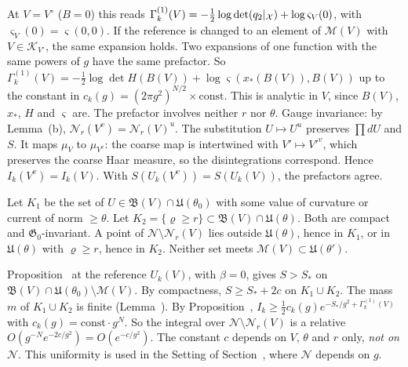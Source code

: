 \begin{detail}
\begin{step}[(vi) Conclusion]
At $V=V^\circ$ ($B=0$) this reads $\Gamma^{(1)}_k(V)=-\frac12\log\det(q_2|_\mathcal X)+\log\varsigma_V(0)$, with $\varsigma_V(0)=\varsigma(0,0)$. If the reference is changed to an element of $\mathscr M(V)$ with $V\in\mathcal K_{V^\circ}$, the same expansion holds. Two expansions of one function with the same powers of $g$ have the same prefactor. So $\Gamma^{(1)}_k(V)=-\frac12\log\det H(B(V))+\log\varsigma(x_*(B(V)),B(V))$ up to the constant in $c_k(g)=(2\pi g^2)^{N/2}\times\mathrm{const}$. This is analytic in $V$, since $B(V)$, $x_*$, $H$ and $\varsigma$ are. The prefactor involves neither $r$ nor $\theta$. Gauge invariance: by Lemma~(b), $\mathscr N_r(V^v)=\mathscr N_r(V)^u$. The substitution $U\mapsto U^u$ preserves $\prod dU$ and $S$. It maps $\mu_V$ to $\mu_{V^v}$: the coarse map is intertwined with $V'\mapsto V'^v$, which preserves the coarse Haar measure, so the disintegrations correspond. Hence $I_k(V^v)=I_k(V)$. With $S(U_k(V^v))=S(U_k(V))$, the prefactors agree.
\end{step}
\end{detail}

\begin{detail}\label{d11a:A12}
\begin{step}[Sets]
Let $K_1$ be the set of $U\in\mathfrak B(V)\cap\mathfrak U(\theta_0)$ with some value of curvature or current of norm $\ge\theta$. Let $K_2=\{\varrho\ge r\}\subset\mathfrak B(V)\cap\mathfrak U(\theta)$. Both are compact and $\mathfrak G_0$-invariant. A point of $\mathscr N\setminus\mathscr N_r(V)$ lies outside $\mathfrak U(\theta)$, hence in $K_1$, or in $\mathfrak U(\theta)$ with $\varrho\ge r$, hence in $K_2$. Neither set meets $\mathscr M(V)\subset\mathfrak U(\theta')$.
\end{step}
\begin{step}
Proposition~ at the reference $U_k(V)$, with $\beta=0$, gives $S>S_*$ on $\mathfrak B(V)\cap\mathfrak U(\theta_0)\setminus\mathscr M(V)$. By compactness, $S\ge S_*+2c$ on $K_1\cup K_2$. The mass $m$ of $K_1\cup K_2$ is finite (Lemma~). By Proposition~, $I_k\ge\frac12c_k(g)e^{-S_*/g^2+\Gamma^{(1)}_k(V)}$ with $c_k(g)=\mathrm{const}\cdot g^N$. So the integral over $\mathscr N\setminus\mathscr N_r(V)$ is a relative $O(g^{-N}e^{-2c/g^2})=O(e^{-c/g^2})$. The constant $c$ depends on $V$, $\theta$ and $r$ only, \emph{not on $\mathscr N$}. This uniformity is used in the Setting of Section~, where $\mathscr N$ depends on $g$.
\end{step}
\end{detail}

